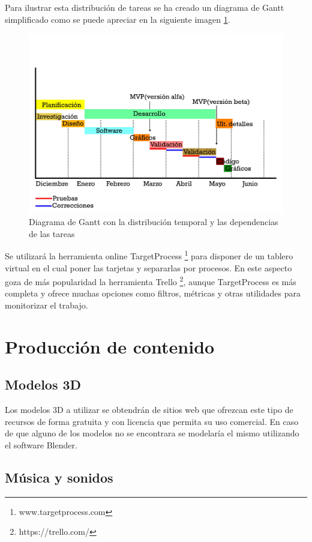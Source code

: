 Para ilustrar esta distribución de tareas se ha creado un diagrama de Gantt simplificado como se puede apreciar en la siguiente imagen \ref{gantt01}.

\begin{figure}
	\begin{center}
		\includegraphics[scale=0.6]{imagenes/GanttDiagram.jpg}
		\caption{Diagrama de Gantt con la distribución temporal y las dependencias de las tareas}
		\label{gantt01}
	\end{center}
\end{figure}

Se utilizará la herramienta online TargetProcess \footnote{www.targetprocess.com} para disponer de un tablero virtual  en el cual poner las tarjetas y separarlas por procesos. En este aspecto goza de más popularidad la herramienta Trello \footnote{https://trello.com/}, aunque TargetProcess es más completa y ofrece muchas opciones como filtros, métricas y otras utilidades para monitorizar el trabajo.

\section{Producción de contenido}
\subsection{Modelos 3D}
Los modelos 3D a utilizar se obtendrán de sitios web que ofrezcan este tipo de recursos de forma gratuita y con licencia que permita su uso comercial. En caso de que alguno de los modelos no se encontrara se modelaría el mismo utilizando el software Blender. 
\subsection{Música y sonidos}



